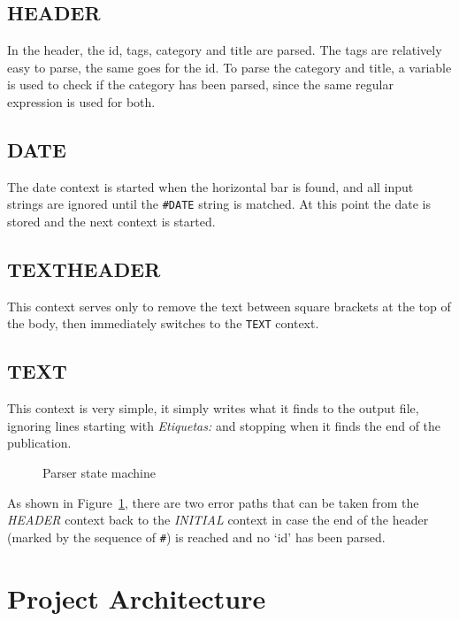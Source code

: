 \documentclass[a4paper]{report}
\begin{document}
\subsection{HEADER}

In the header, the id, tags, category and title are parsed. The tags are
relatively easy to parse, the same goes for the id. To parse the category and
title, a variable is used to check if the category has been parsed, since the
same regular expression is used for both.

\subsection{DATE}

The date context is started when the horizontal bar is found, and all input
strings are ignored until the \texttt{\#DATE} string is matched. At this point
the date is stored and the next context is started.

\subsection{TEXTHEADER}

This context serves only to remove the text between square brackets at the top
of the body, then immediately switches to the \texttt{TEXT} context.

\subsection{TEXT}

This context is very simple, it simply writes what it finds to the output file,
ignoring lines starting with \textit{Etiquetas:} and stopping when it finds the
end of the publication.

\begin{figure}[H]
    
    \caption{Parser state machine}\label{fig:parser_state_machine}
\end{figure}

As shown in Figure~\ref{fig:parser_state_machine}, there are two error paths
that can be taken from the \textit{HEADER} context back to the \textit{INITIAL}
context in case the end of the header (marked by the sequence of \verb!#!) is
reached and no `id' has been parsed.

\section{Project Architecture}
\end{document}
